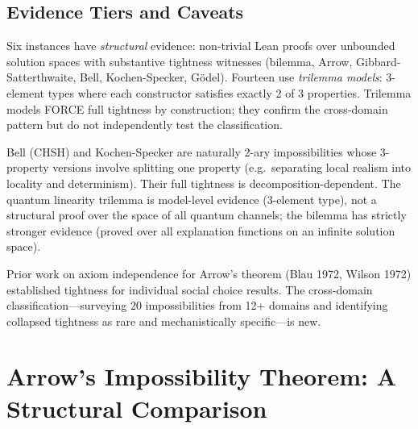 \documentclass[11pt,a4paper]{article}
\begin{document}
\subsection{Evidence Tiers and Caveats}

Six instances have \emph{structural} evidence: non-trivial Lean proofs over unbounded solution spaces with substantive tightness witnesses (bilemma, Arrow, Gibbard-Satterthwaite, Bell, Kochen-Specker, G\"odel).  Fourteen use \emph{trilemma models}: 3-element types where each constructor satisfies exactly 2 of 3 properties.  Trilemma models FORCE full tightness by construction; they confirm the cross-domain pattern but do not independently test the classification.

Bell (CHSH) and Kochen-Specker are naturally 2-ary impossibilities whose 3-property versions involve splitting one property (e.g.\ separating local realism into locality and determinism).  Their full tightness is decomposition-dependent.  The quantum linearity trilemma is model-level evidence (3-element type), not a structural proof over the space of all quantum channels; the bilemma has strictly stronger evidence (proved over all explanation functions on an infinite solution space).

Prior work on axiom independence for Arrow's theorem (Blau 1972, Wilson 1972) established tightness for individual social choice results.  The cross-domain classification---surveying 20 impossibilities from 12+ domains and identifying collapsed tightness as rare and mechanistically specific---is new.




\clearpage
\appendix

\section{Arrow's Impossibility Theorem: A Structural Comparison}
\label{app:arrow}


\end{document}
